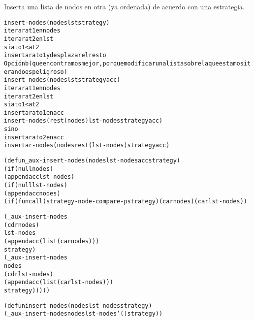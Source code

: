 \begin{aibox}{\comments}
Inserta una lista de nodos en otra (ya ordenada) de acuerdo con una estrategia.

\end{aibox}

\begin{aibox}{\pseudocode}
\begin{alltt}
insert-nodes(nodes lst strategy)
	iterar at1 en nodes
		iterar at2 en lst
			si ato1 < at2
				insertar ato1 y desplazar el resto
Opción b (que encontramos mejor, porque modificar una lista sobre la que estamos iterando es peligroso)
insert-nodes(nodes lst strategy acc)
	iterar at1 en nodes
		iterar at2 en lst
			si ato1 < at2
				insertar ato1 en acc
				insert-nodes (rest(nodes) lst-nodes strategy acc)
			sino
				insertar ato2 en acc
				insertar-nodes (nodes rest(lst-nodes) strategy acc)

\end{alltt}
\end{aibox}

\begin{aibox}{\code}
\begin{alltt}
(defun \_aux-insert-nodes (nodes lst-nodes acc strategy)
	(if (null nodes)
		(append acc lst-nodes)
		(if (null lst-nodes)
			(append acc nodes)
			(if  (funcall (strategy-node-compare-p strategy) (car nodes) (car lst-nodes))

				(\_aux-insert-nodes 
					(cdr nodes)
					lst-nodes
					(append acc (list (car nodes)))
					strategy)
				(\_aux-insert-nodes
					nodes
					(cdr lst-nodes)
					(append acc (list (car lst-nodes)))
					strategy)))))

(defun insert-nodes (nodes lst-nodes strategy)
	(\_aux-insert-nodes nodes lst-nodes '() strategy))




\end{alltt}
\end{aibox}

